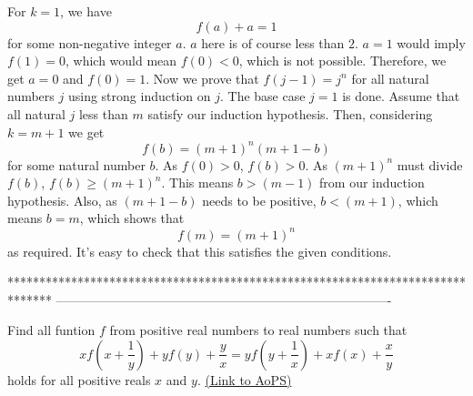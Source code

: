 


\begin{solution}
	For $k = 1$, we have
$$f(a) + a = 1$$
 for some non-negative integer $a$. $a$ here is of course less than $2$. $a = 1$ would imply $f(1) = 0$, which would mean $f(0) < 0$, which is not possible. Therefore, we get $a = 0$ and $f(0) = 1$.
Now we prove that $f(j-1) = j^n$ for all natural numbers $j$ using strong induction on $j$.
The base case $j = 1$ is done.
Assume that all natural $j$ less than $m$ satisfy our induction hypothesis.
Then, considering $k = m+1$ we get
$$f(b) = (m+1)^n(m+1-b)$$
for some natural number $b$. As $f(0) > 0$, $f(b) > 0$. As $(m+1)^n$ must divide $f(b)$, $f(b) \geq (m+1)^n$. This means $b > (m-1)$ from our induction hypothesis. Also, as $(m+1-b)$ needs to be positive, $b < (m+1)$,  which means $b = m$, which shows that
$$f(m) = (m+1)^n$$
as required.
It's easy to check that this satisfies the given conditions.
\end{solution}
*******************************************************************************
-------------------------------------------------------------------------------

\begin{problem}
	Find all funtion $ f$ from positive real numbers to real numbers such that
\[ xf\left (x + \frac {1}{y}\right ) + yf(y) + \frac {y}{x} = yf\left (y + \frac {1}{x}\right ) + xf(x) + \frac {x}{y}\]
holds for all positive reals $x$ and $y$.
	\flushright \href{https://artofproblemsolving.com/community/c6h321307}{(Link to AoPS)}
\end{problem}



